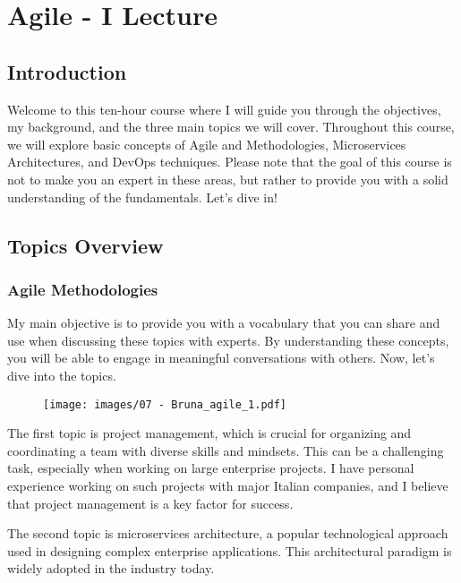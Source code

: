\section{Agile - I Lecture}

\subsection{Introduction}

Welcome to this ten-hour course where I will guide you through the
objectives, my background, and the three main topics we will cover.
Throughout this course, we will explore basic concepts of Agile and
Methodologies, Microservices Architectures, and DevOps techniques.
Please note that the goal of this course is not to make you an expert in
these areas, but rather to provide you with a solid understanding of the
fundamentals. Let's dive in!

\subsection{Topics Overview}

\subsubsection{Agile Methodologies}

My main objective is to provide you with a vocabulary that you can share
and use when discussing these topics with experts. By understanding
these concepts, you will be able to engage in meaningful conversations
with others. Now, let's dive into the topics.

\begin{figure}[!h]
  \centering
  \texttt{[image: images/07 - Bruna\_agile\_1.pdf]}
\end{figure}

The first topic is project management, which is crucial for organizing
and coordinating a team with diverse skills and mindsets. This can be a
challenging task, especially when working on large enterprise projects.
I have personal experience working on such projects with major Italian
companies, and I believe that project management is a key factor for
success.

The second topic is microservices architecture, a popular technological
approach used in designing complex enterprise applications. This
architectural paradigm is widely adopted in the industry today.

